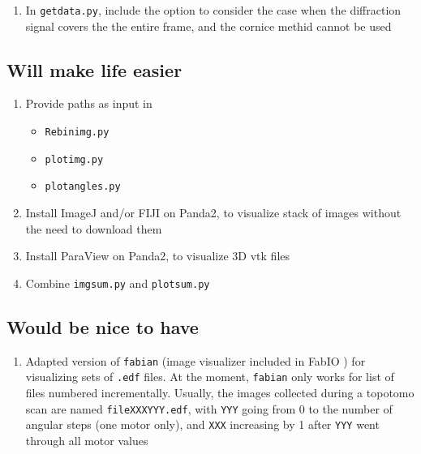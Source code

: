 \documentclass[11pt]{scrartcl}
\begin{document}
\begin{enumerate}
    \item In {\texttt{getdata.py}}, include the option to consider the case when the diffraction signal covers the the entire frame, and the cornice methid cannot be used
\end{enumerate}

\subsection{Will make life easier}

\begin{enumerate}
    \item Provide paths as input in 
    \begin{itemize}
        \item {\texttt{Rebin\textunderscore img.py}}
        \item {\texttt{plot\textunderscore img.py}}
        \item {\texttt{plot\textunderscore angles.py}}
    \end{itemize}
    \item Install ImageJ and/or {\footnotesize{FIJI}} on Panda2, to visualize stack of images without the need to download them
    \item Install ParaView on Panda2, to visualize {\footnotesize{3D}} vtk files
    \item Combine {\texttt{img\textunderscore sum.py}} and {\texttt{plot\textunderscore sum.py}}
\end{enumerate}

\subsection{Would be nice to have}

\begin{enumerate}
    \item Adapted version of {\texttt{fabian}} (image visualizer included in FabIO \cite{knudsen2013fabio}) for visualizing sets of {\texttt{.edf}} files. At the moment, {\texttt{fabian}} only works for list of files numbered incrementally. Usually, the images collected during a topotomo scan are named {\texttt{file\textunderscore XXX\textunderscore YYY.edf}}, with {\texttt{YYY}} going from 0 to the number of angular steps (one motor only), and {\texttt{XXX}} increasing by 1 after {\texttt{YYY}} went through all motor values
\end{enumerate}
\end{document}
